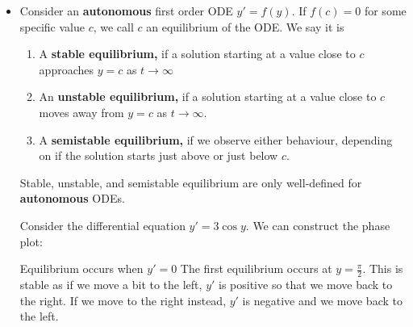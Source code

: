 \begin{itemize}
\begin{center}
          \end{center}
    \item Consider an \textbf{autonomous} first order ODE $y'=f(y)$. If $f(c)=0$ for some specific value $c$, we call $c$ an equilibrium of the ODE. We say it is
          \begin{enumerate}
              \item A \textbf{stable equilibrium,} if a solution starting at a value close to $c$ approaches $y=c$ as $t\rightarrow\infty$
              \item An \textbf{unstable equilibrium,} if a solution starting at a value close to $c$ moves away from $y=c$ as $t\rightarrow\infty$.
              \item A \textbf{semistable equilibrium,} if we observe either behaviour, depending on if the solution starts just above or just below $c$.
          \end{enumerate}
          \begin{warning}
            Stable, unstable, and semistable equilibrium are only well-defined for \textbf{autonomous} ODEs.
          \end{warning}
          \begin{example}
              Consider the differential equation $y'=3\cos y$. We can construct the phase plot:
              \begin{center}
              \end{center}
              Equilibrium occurs when $y'=0$ The first equilibrium occurs at $y=\frac{\pi}{2}$. This is stable as if we move a bit to the left, $y'$ is positive so that we move back to the right. If we move to the right instead, $y'$ is negative and we move back to the left.
              \vspace{2mm}


\end{example}
\end{itemize}
